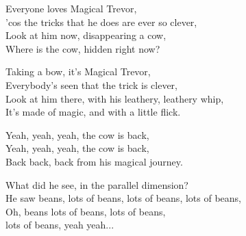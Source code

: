 \vspace{10pt}
Everyone loves Magical Trevor,\\
'cos the tricks that he does are ever so clever,\\
Look at him now, disappearing a cow,\\
Where is the cow, hidden right now?\par
\vspace{10pt}
Taking a bow, it's Magical Trevor,\\
Everybody's seen that the trick is clever,\\
Look at him there, with his leathery, leathery whip,\\
It's made of magic, and with a little flick.\par
\vspace{10pt}
Yeah, yeah, yeah, the cow is back,\\
Yeah, yeah, yeah, the cow is back,\\
Back back, back from his magical journey.\par
\vspace{10pt}
What did he see, in the parallel dimension?\\
He saw beans, lots of beans, lots of beans, lots of beans,\\
Oh, beans lots of beans, lots of beans,\\
lots of beans, yeah yeah...
